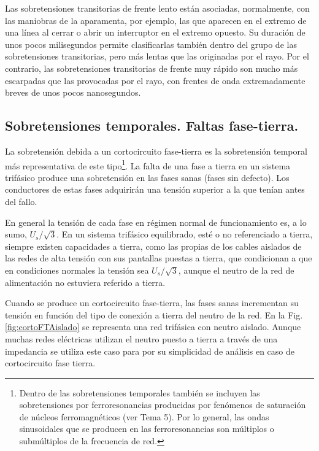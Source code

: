             Las sobretensiones transitorias de frente lento están asociadas, normalmente, con las maniobras de la aparamenta, por ejemplo, las que aparecen en el extremo de una línea al cerrar o abrir un interruptor en el extremo opuesto. Su duración de unos pocos milisegundos permite clasificarlas también dentro del grupo de las sobretensiones transitorias, pero más lentas que las originadas por el rayo. Por el contrario, las sobretensiones transitorias de frente muy rápido son mucho más escarpadas que las provocadas por el rayo, con frentes de onda extremadamente breves de unos pocos nanosegundos.

        \subsection{Sobretensiones temporales. Faltas fase-tierra.}
            La sobretensión debida a un cortocircuito fase-tierra es la sobretensión temporal más representativa de este tipo\footnote{Dentro de las sobretensiones temporales también se incluyen las sobretensiones por ferroresonancias producidas por fenómenos de saturación de núcleos ferromagnéticos (ver Tema 5). Por lo general, las ondas sinusoidales que se producen en las ferroresonancias son múltiplos o submúltiplos de la frecuencia de red.}. La falta de una fase a tierra en un sistema trifásico produce una sobretensión en las fases sanas (fases sin defecto). Los conductores de estas fases adquirirán una tensión superior a la que tenían antes del fallo.\newline
            
            En general la tensión de cada fase en régimen normal de funcionamiento es, a lo sumo, $U_\textit{s}/\sqrt{3}$. En un sistema trifásico equilibrado, esté o no referenciado a tierra, siempre existen capacidades a tierra, como las propias de los cables aislados de las redes de alta tensión con sus pantallas puestas a tierra, que condicionan a que en condiciones normales la tensión sea $U_\textit{s}/\sqrt{3}$, aunque el neutro de la red de alimentación no estuviera referido a tierra.\newline

            Cuando se produce un cortocircuito fase-tierra, las fases sanas incrementan su tensión en función del tipo de conexión a tierra del neutro de la red. En la Fig. \ref{fig:cortoFTAislado} se representa una red trifásica con neutro aislado. Aunque muchas redes eléctricas utilizan el neutro puesto a tierra a través de una impedancia se utiliza este caso para por su simplicidad de análisis en caso de cortocircuito fase tierra.

